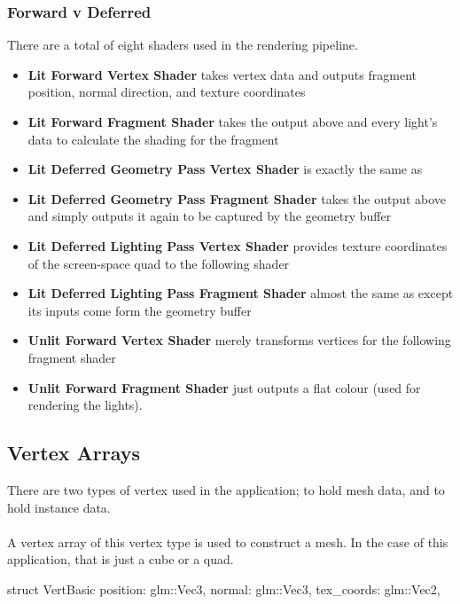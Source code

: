 \subsubsection{Forward v Deferred}
There are a total of eight shaders used in the rendering pipeline.
\begin{itemize}
  \item {} \textbf{Lit Forward Vertex Shader} takes vertex data and outputs fragment position, normal direction, and texture coordinates
  \item {} \textbf{Lit Forward Fragment Shader} takes the output above and every light's data to calculate the shading for the fragment
  \item {} \textbf{Lit Deferred Geometry Pass Vertex Shader} is exactly the same as 
  \item {} \textbf{Lit Deferred Geometry Pass Fragment Shader} takes the output above and simply outputs it again to be captured by the geometry buffer
  \item {} \textbf{Lit Deferred Lighting Pass Vertex Shader} provides texture coordinates of the screen-space quad to the following shader
  \item {} \textbf{Lit Deferred Lighting Pass Fragment Shader} almost the same as  except its inputs come form the geometry buffer
  \item {} \textbf{Unlit Forward Vertex Shader} merely transforms vertices for the following fragment shader
  \item {} \textbf{Unlit Forward Fragment Shader} just outputs a flat colour (used for rendering the lights).
\end{itemize}

\subsection{Vertex Arrays}
There are two types of vertex used in the application;  to hold mesh data, and  to hold instance data.

\paragraph{}
A vertex array of this vertex type is used to construct a mesh.
In the case of this application, that is just a cube or a quad.
  \begin{rustcode}
struct VertBasic {
    position: glm::Vec3,
    normal: glm::Vec3,
    tex_coords: glm::Vec2,
}
  \end{rustcode}


